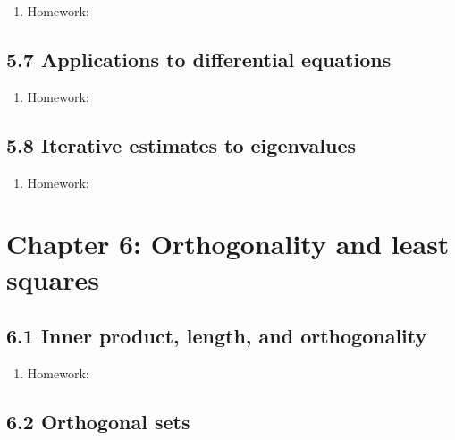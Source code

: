 \documentclass{article}
\begin{document}
\begin{enumerate}

\item Homework: 

\end{enumerate}

\subsection{5.7 Applications to differential equations}

\begin{enumerate}

\item Homework: 

\end{enumerate}

\subsection{5.8 Iterative estimates to eigenvalues}

\begin{enumerate}

\item Homework: 

\end{enumerate}

\section{Chapter 6: Orthogonality and least squares} 

\subsection{6.1 Inner product, length, and orthogonality}

\begin{enumerate}

\item Homework: 

\end{enumerate}

\subsection{6.2 Orthogonal sets}
\end{document}
